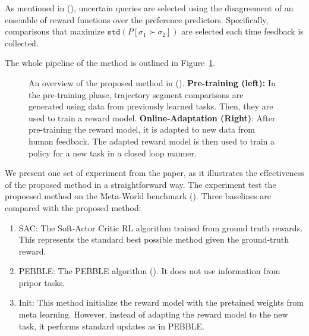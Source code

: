\documentclass[
  letterpaper,
  numbers=noenddot,
  DIV=11,
  oneside]{scrreprt}
\theoremstyle{remark}
\begin{document}
As mentioned in (), uncertain queries are selected using the disagreement of an
ensemble of reward functions over the preference predictors.
Specifically, comparisons that maximize
\(\texttt{std}(P[\sigma_1 \succ \sigma_2])\) are selected each time
feedback is collected.

The whole pipeline of the method is outlined in Figure~\ref{fig-few-1}.

\begin{figure}


\caption{\label{fig-few-1}An overview of the proposed method in
().
\textbf{Pre-training (left):} In the pre-training phase, trajectory
segment comparisons are generated using data from previously learned
tasks. Then, they are used to train a reward model.
\textbf{Online-Adaptation (Right)}: After pre-training the reward model,
it is adapted to new data from human feedback. The adapted reward model
is then used to train a policy for a new task in a closed loop manner.}

\end{figure}%

We present one set of experiment from the paper, as it illustrates the
effectiveness of the proposed method in a straightforward way. The
experiment test the propoesed method on the Meta-World benchmark
(). Three baselines are
compared with the proposed method:

\begin{enumerate}
\def\labelenumi{\arabic{enumi}.}
\item
  SAC: The Soft-Actor Critic RL algorithm trained from ground truth
  rewards. This represents the standard best possible method given the
  ground-truth reward.
\item
  PEBBLE: The PEBBLE algorithm (). It does not use information from pripor tasks.
\item
  Init: This method initialize the reward model with the pretained
  weights from meta learning. However, instead of adapting the reward
  model to the new task, it performs standard updates as in PEBBLE.
\end{enumerate}
\end{document}
